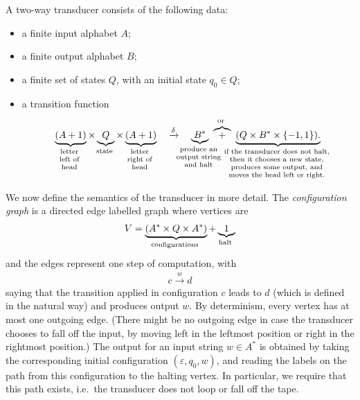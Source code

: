\begin{definition}\label{def:two-way-transducer}
    A two-way  transducer consists of 
    the following data:
    \begin{itemize}
        \item a finite input alphabet $A$;
        \item a finite output alphabet $B$;
        \item a finite set of states $Q$, with an initial state $q_0 \in Q$;
        \item a transition function
        \begin{align*}
        \myunderbrace{(A+1)}{letter \\ left of \\  head} \times 
        \myunderbrace{Q}{state} \times 
        \myunderbrace{(A+1)}{letter \\ right of \\  head} 
       \quad  \xrightarrow \delta  \quad 
         \myunderbrace{B^*}{produce an \\ output string \\ and halt} 
         \ \myoverbrace{+}{or} \   
            \myunderbrace{(Q \times 
            B^* \times 
            \set{-1,1}).}{if the transducer does not halt, \\  then it chooses a new state, \\  produces some output, and  \\  moves the head  left or right.}
        \end{align*}
    \end{itemize}
\end{definition}

We now define the semantics of the transducer in more detail. The \emph{configuration graph} is a directed edge labelled  graph where vertices are 
\begin{align*}
V = \myunderbrace{(A^* \times Q \times A^*)}{configurations} + 
\myunderbrace 1 {halt}
\end{align*} 
and the edges represent one step of computation, with  
\begin{align*}
c \xrightarrow w d
\end{align*} 
saying that  the transition applied in configuration $c$ leads to $d$ (which is defined in the natural way) and produces output $w$. By determinism, every vertex has at most one outgoing edge. (There might be no outgoing edge in case the transducer chooses to fall off the input, by moving left in the leftmost position or right in the rightmost position.)  The output for an input string $w \in A^*$ is obtained by taking the corresponding initial configuration $(\varepsilon, q_0, w)$, and reading the labels on the path from this configuration to the halting vertex. In particular, we require that this path exists, i.e.~the transducer does not loop or fall off the tape.

